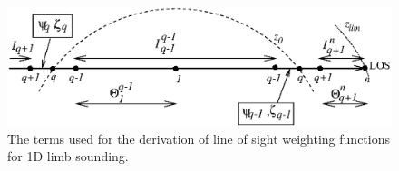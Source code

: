  \begin{figure}[tb]
  \begin{center}
   \includegraphics*[width=0.95\hsize]{Figs/wf2.eps}
   \caption{The terms used for the derivation of line of sight weighting
            functions for 1D limb sounding.}
   \label{fig:wfuns:limb}  
  \end{center}
 \end{figure}
 
